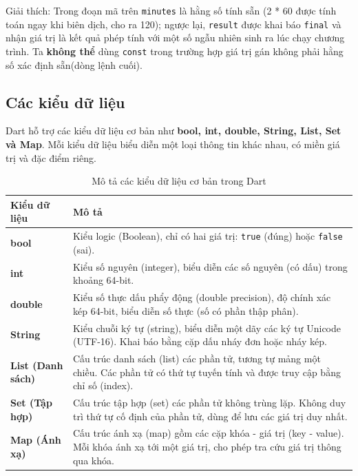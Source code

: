 \documentclass[../DoAn.tex]{subfiles}
\numberwithin{figure}{chapter}
\begin{document}
Giải thích: 
Trong đoạn mã trên \texttt{minutes} là hằng số tính sẵn (2 * 60 được tính toán ngay khi biên dịch, cho ra 120); ngược lại, \texttt{result} được khai báo \texttt{final} và nhận giá trị là kết quả phép tính với một số ngẫu nhiên sinh ra lúc chạy chương trình. Ta \textbf{không thể} dùng \texttt{const} trong trường hợp giá trị gán không phải hằng số xác định sẵn(dòng lệnh cuối).

\subsection{Các kiểu dữ liệu} 
Dart hỗ trợ các kiểu dữ liệu cơ bản như \textbf{bool, int, double, String, List, Set và Map}. Mỗi kiểu dữ liệu biểu diễn một loại thông tin khác nhau, có miền giá trị và đặc điểm riêng.

\begin{table}[h]
\centering
\begin{tabular}{|p{}|p{}|}
\hline
\textbf{Kiểu dữ liệu} & \textbf{Mô tả} \\ \hline
\textbf{bool} & Kiểu logic (Boolean), chỉ có hai giá trị: \texttt{true} (đúng) hoặc \texttt{false} (sai). \\ \hline
\textbf{int} & Kiểu số nguyên (integer), biểu diễn các số nguyên (có dấu) trong khoảng 64-bit. \\ \hline
\textbf{double} & Kiểu số thực dấu phẩy động (double precision), độ chính xác kép 64-bit, biểu diễn số thực (số có phần thập phân). \\ \hline
\textbf{String} & Kiểu chuỗi ký tự (string), biểu diễn một dãy các ký tự Unicode (UTF-16). Khai báo bằng cặp dấu nháy đơn hoặc nháy kép. \\ \hline
\textbf{List (Danh sách)} & Cấu trúc danh sách (list) các phần tử, tương tự mảng một chiều. Các phần tử có thứ tự tuyến tính và được truy cập bằng chỉ số (index). \\ \hline
\textbf{Set (Tập hợp)} & Cấu trúc tập hợp (set) các phần tử không trùng lặp. Không duy trì thứ tự cố định của phần tử, dùng để lưu các giá trị duy nhất. \\ \hline
\textbf{Map (Ánh xạ)} & Cấu trúc ánh xạ (map) gồm các cặp khóa - giá trị (key - value). Mỗi khóa ánh xạ tới một giá trị, cho phép tra cứu giá trị thông qua khóa. \\ \hline
\end{tabular}
\caption{Mô tả các kiểu dữ liệu cơ bản trong Dart}
\end{table}
\end{document}
